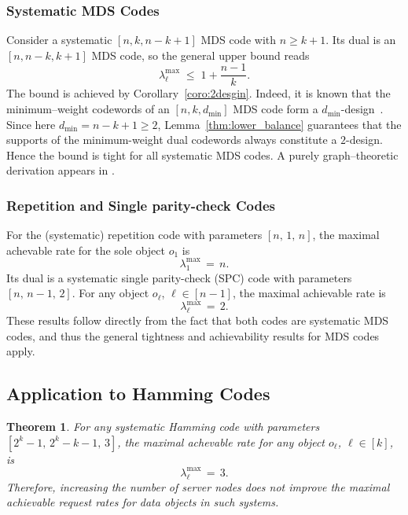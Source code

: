 \documentclass[conference,letterpaper]{IEEEtran}
\newtheorem{theorem}{Theorem}
\begin{document}
\subsubsection{Systematic MDS Codes}  
  Consider a systematic $[n,k,n-k+1]$ MDS code with $n\ge k+1$.  
  Its dual is an $[n,n-k,k+1]$ MDS code, so the general upper bound reads
  \[
     \lambda_{\ell}^{\max}\;\le\;1+\frac{n-1}{k}.
  \]
The bound is achieved by Corollary~\ref{coro:2desgin}. Indeed, it is known that the minimum–weight codewords of an $[n,k,d_{\min}]$ MDS code form a $d_{\min}$-design~\cite{5_designs:journals/joct/AssusH69}. Since here $d_{\min}=n-k+1\ge2$, Lemma~\ref{thm:lower_balance} guarantees that the supports of the minimum-weight dual codewords always constitute a $2$-design. Hence the bound is tight for all systematic MDS codes. A purely graph–theoretic derivation appears in
  \cite{SRR:journals/tit/AktasJKKS21,SRR:lySV2025}.

    
    \subsubsection{Repetition and Single parity-check Codes} For the (systematic) repetition code with parameters \( [n,\, 1,\, n] \), the maximal achevable rate for the sole object \( o_1 \) is 
    \[
    \lambda_1^{\max} \,=\, n.
    \]
    Its dual is a systematic single parity-check (SPC) code with parameters \( [n,\, n - 1,\, 2] \). For any object \( o_{\ell} \), \( \ell \in [n-1] \), the maximal achievable rate is
    \[
    \lambda_{\ell}^{\max} \,=\, 2.
    \]
    These results follow directly from the fact that both codes are systematic MDS codes, and thus the general tightness and achievability results for MDS codes apply.

\subsection{Application to Hamming Codes}
\begin{theorem}\label{thm:Hamming_demand}
For any systematic Hamming code with parameters \( [2^k - 1,\, 2^k - k - 1,\, 3] \), the maximal achevable rate for any object \( o_{\ell} \), \( \ell \in [k] \), is
\[
\lambda_{\ell}^{\max} \,=\, 3.
\]
Therefore, increasing the number of server nodes does not improve the maximal achievable request rates for data objects in such systems.
\end{theorem}
\end{document}
